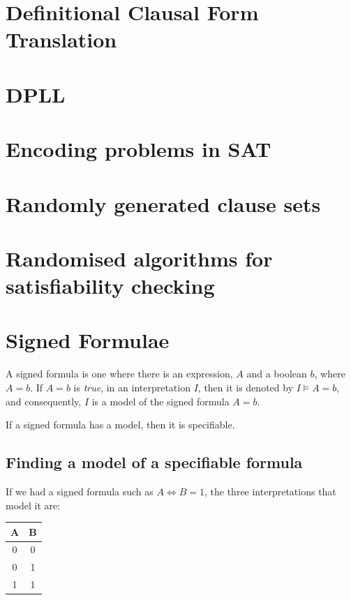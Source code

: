 \section{Definitional Clausal Form Translation}

\section{DPLL}

\section{Encoding problems in SAT}

\section{Randomly generated clause sets}

\section{Randomised algorithms for satisfiability checking}

\section{Signed Formulae}

A signed formula is one where there is an expression, $A$ and a boolean $b$,
where $A = b$. If $A = b$ is {\it true}, in an interpretation $I$, then it is
denoted by $I \models A = b$, and consequently, $I$ is a model of the signed
formula $A = b$.


If a signed formula has a model, then it is specifiable.

\subsection{Finding a model of a specifiable formula}

If we had a signed formula such as $A \Leftrightarrow B = 1$, the three
interpretations that model it are:

\begin{center}
    \begin{tabular}{cc}
        A & B\\ \hline
        0 & 0\\
        0 & 1\\
        1 & 1\\
    \end{tabular}
\end{center}


